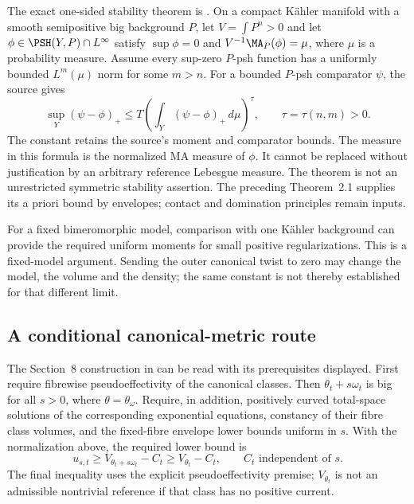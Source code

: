 The exact one-sided stability theorem is
\cite[Theorem~2.6, printed pp.~1195--1197]{GuedjLu25EnvelopeEstimatesPublished}.
On a compact K\"ahler manifold with a smooth semipositive big
background $P$, let $V=\int P^n>0$ and let
$\phi\in\PSH(Y,P)\cap L^\infty$ satisfy $\sup\phi=0$ and
$V^{-1}\MA_P(\phi)=\mu$, where $\mu$ is a probability measure.
Assume every sup-zero $P$-psh function has a uniformly bounded
$L^m(\mu)$ norm for some $m>n$. For a bounded $P$-psh comparator
$\psi$, the source gives
\begin{equation*}
 \sup_Y(\psi-\phi)_+
 \leq T\left(\int_Y(\psi-\phi)_+\,d\mu\right)^\tau,
 \qquad \tau=\tau(n,m)>0.
\tag{H.77}\label{eq:appH-KE-one-sided-stability}
\end{equation*}
The constant retains the source's moment and comparator bounds.
The measure in this formula is the normalized MA measure of $\phi$.
It cannot be replaced without justification by an arbitrary reference
Lebesgue measure. The theorem is not an unrestricted symmetric
stability assertion. The preceding Theorem~2.1 supplies its a priori
bound by envelopes; contact and domination principles remain inputs.

For a fixed bimeromorphic model, comparison with one K\"ahler
background can provide the required uniform moments for small
positive regularizations. This is a fixed-model argument. Sending
the outer canonical twist to zero may change the model, the volume
and the density; the same constant is not thereby established for
that different limit.

\subsection{A conditional canonical-metric route}
\label{sec:appH-KE-canonical-route}

The Section~8 construction in \cite{LPWZ26KEV1} can be read with
its prerequisites displayed. First require fibrewise pseudoeffectivity
of the canonical classes. Then $\theta_t+s\omega_t$ is big for
all $s>0$, where $\theta=\theta_\omega$. Require, in addition,
positively curved total-space solutions of the corresponding
exponential equations, constancy of their fibre class volumes,
and the fixed-fibre envelope lower bounds uniform in $s$.
With the normalization above, the required lower bound is
\begin{equation*}
 u_{s,t}\geq V_{\theta_t+s\omega_t}-C_t
              \geq V_{\theta_t}-C_t,
 \qquad C_t\text{ independent of }s.
\tag{H.78}\label{eq:appH-KE-envelope-lower-bound}
\end{equation*}
The final inequality uses the explicit pseudoeffectivity premise;
$V_{\theta_t}$ is not an admissible nontrivial reference if that
class has no positive current.

